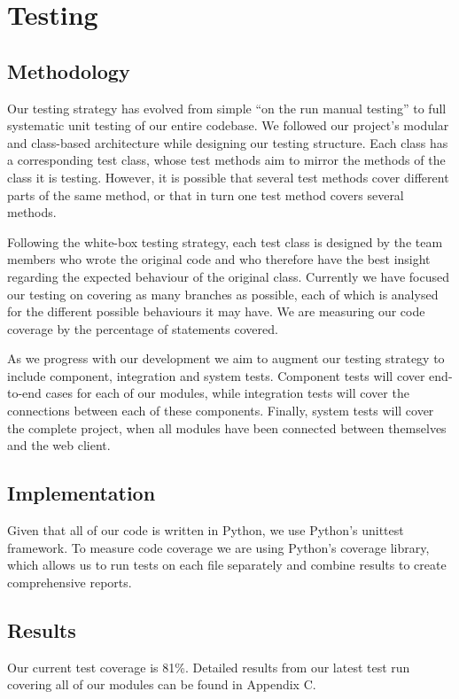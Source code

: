 \documentclass[a4paper,11pt]{article}
\begin{document}
\section{Testing}

\subsection{Methodology}
Our testing strategy has evolved from simple ``on the run manual testing'' to full systematic unit testing of our entire codebase. We followed our project's modular and class-based architecture while designing our testing structure. Each class has a corresponding test class, whose test methods aim to mirror the methods of the class it is testing. However, it is possible that several test methods cover different parts of the same method, or that in turn one test method covers several methods.

Following the white-box testing strategy, each test class is designed by the team members who wrote the original code and who therefore have the best insight regarding the expected behaviour of the original class. Currently we have focused our testing on covering as many branches as possible, each of which is analysed for the different possible behaviours it may have. We are measuring our code coverage by the percentage of statements covered. 

As we progress with our development we aim to augment our testing strategy to include component, integration and system tests. Component tests will cover end-to-end cases for each of our modules, while integration tests will cover the connections between each of these components. Finally, system tests will cover the complete project, when all modules have been connected between themselves and the web client.

\subsection{Implementation}
Given that all of our code is written in Python, we use Python's unittest framework. To measure code coverage we are using Python's coverage library, which allows us to run tests on each file separately and combine results to create comprehensive reports.

\subsection{Results}
Our current test coverage is 81\%. Detailed results from our latest test run covering all of our modules can be found in Appendix C.
\end{document}
